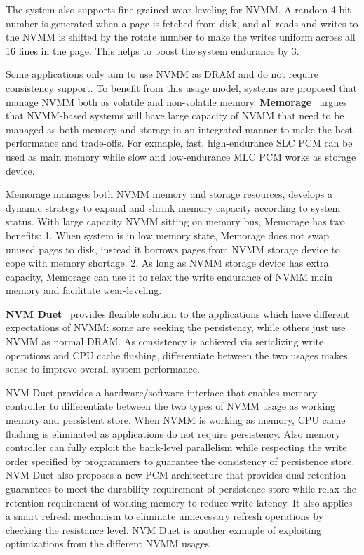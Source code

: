 The system also supports fine-grained wear-leveling for NVMM. A random 4-bit 
number is generated when a page is fetched from disk, and all reads and writes
to the NVMM is shifted by the rotate number to make
the writes uniform across all 16 lines in the page.
This helps to boost the system endurance by 3\x{}.

Some applications only aim to use NVMM as DRAM and do not require consistency
support. To benefit from this usage model, systems are proposed that
manage NVMM both as volatile and non-volatile memory.
\textbf{Memorage}~\cite{memorage} argues that NVMM-based systems will have large
capacity of NVMM that need to be managed as both memory and storage in
an integrated manner to make the best performance and trade-offs. For exmaple,
fast, high-endurance SLC PCM can be used as main memory
while slow and low-endurance MLC PCM works as storage device.

Memorage manages both NVMM memory and storage resources, develops a dynamic
strategy to expand and shrink memory capacity according to system status. 
With large capacity NVMM sitting on memory bus, Memorage has two benefits:
1. When system is in low memory state, Memorage does not swap unused pages
to disk, instead it borrows pages from NVMM storage device to cope with
memory shortage.
2. As long as NVMM storage device has extra capacity, Memorage can use it
to relax the write endurance of NVMM main memory and facilitate wear-leveling.

\textbf{NVM Duet}~\cite{duet} provides flexible solution to the applications
which
have different expectations of NVMM: some are seeking the persistency, while
others just use NVMM as normal DRAM. As consistency is achieved via serializing
write operations and CPU cache flushing, differentiate between the two usages
makes sense to improve overall system performance.

NVM Duet provides a hardware/software interface that enables memory controller
to differentiate between the two types of NVMM usage as working memory and
persistent store. When NVMM is working as memory, CPU cache flushing is
eliminated as applications do not require persistency. Also memory controller
can fully exploit the bank-level parallelism while respecting the write order 
specified by programmers to guarantee the consistency of persistence store.
NVM Duet also proposes a new PCM architecture that provides dual retention
guarantees to meet the durability requirement of persistence store while relax
the retention requirement of working memory to reduce write latency. It also
applies a smart refresh mechanism to eliminate unnecessary refresh operations
by checking the resistance level. NVM Duet is another exmaple of exploiting
optimizations from the different NVMM usages.

